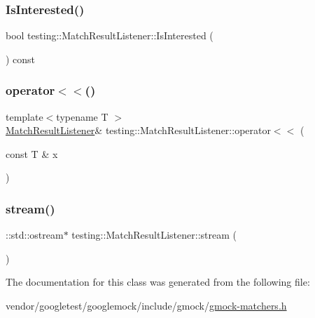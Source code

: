 \subsubsection{\texorpdfstring{Is\+Interested()}{IsInterested()}}
{\footnotesize\ttfamily bool testing\+::\+Match\+Result\+Listener\+::\+Is\+Interested (\begin{DoxyParamCaption}{ }\end{DoxyParamCaption}) const\hspace{0.3cm}{\ttfamily [inline]}}

\mbox{\label{classtesting_1_1_match_result_listener_a89f628a452635d1502a9062d9c864ebd}} 
\subsubsection{\texorpdfstring{operator$<$$<$()}{operator<<()}}
{\footnotesize\ttfamily template$<$typename T $>$ \\
\hyperlink{classtesting_1_1_match_result_listener}{Match\+Result\+Listener}\& testing\+::\+Match\+Result\+Listener\+::operator$<$$<$ (\begin{DoxyParamCaption}\item[{const T \&}]{x }\end{DoxyParamCaption})\hspace{0.3cm}{\ttfamily [inline]}}

\mbox{\label{classtesting_1_1_match_result_listener_a5abecb247e005f7f50a94898e3f44ee3}} 
\subsubsection{\texorpdfstring{stream()}{stream()}}
{\footnotesize\ttfamily \+::std\+::ostream$\ast$ testing\+::\+Match\+Result\+Listener\+::stream (\begin{DoxyParamCaption}{ }\end{DoxyParamCaption})\hspace{0.3cm}{\ttfamily [inline]}}



The documentation for this class was generated from the following file\+:\begin{DoxyCompactItemize}
\item 
vendor/googletest/googlemock/include/gmock/\hyperlink{gmock-matchers_8h}{gmock-\/matchers.\+h}\end{DoxyCompactItemize}
